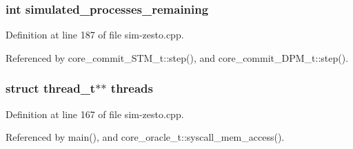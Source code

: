 \subsubsection[{simulated\_\-processes\_\-remaining}]{\setlength{\rightskip}{0pt plus 5cm}int {\bf simulated\_\-processes\_\-remaining}}\label{thread_8h_1b2701dab57f1ffb6459bbde33452d68}




Definition at line 187 of file sim-zesto.cpp.

Referenced by core\_\-commit\_\-STM\_\-t::step(), and core\_\-commit\_\-DPM\_\-t::step().
\subsubsection[{threads}]{\setlength{\rightskip}{0pt plus 5cm}struct {\bf thread\_\-t}$\ast$$\ast$ {\bf threads}}\label{thread_8h_f227be61b1f91b71aafae105501d92f7}




Definition at line 167 of file sim-zesto.cpp.

Referenced by main(), and core\_\-oracle\_\-t::syscall\_\-mem\_\-access().